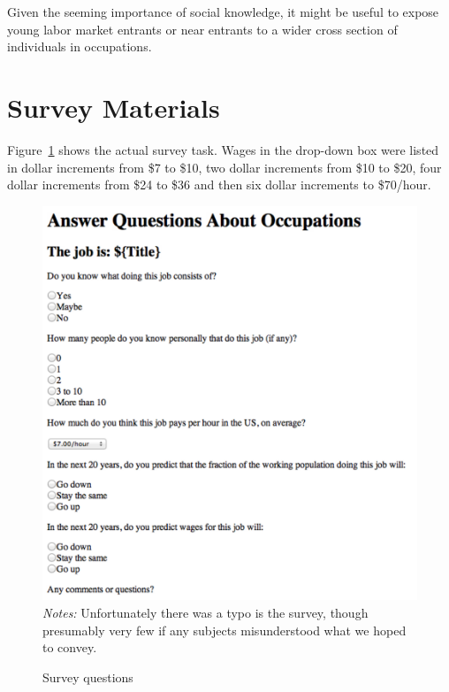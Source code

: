 \documentclass[11pt]{article}
\begin{document}
Given the seeming importance of social knowledge, it might be useful to expose young labor market entrants or near entrants to a wider cross section of individuals in occupations.
 




\newpage 

\appendix 

\section{Survey Materials} \label{sec:survey}  
Figure~\ref{fig:survey} shows the actual survey task.  
Wages in the drop-down box were listed in dollar increments from \$7 to \$10, two dollar increments from \$10 to \$20, four dollar increments from \$24 to \$36 and then six dollar increments to \$70/hour.  

\begin{figure}
\centering
\caption{Survey questions \label{fig:survey}}
\begin{minipage}{0.75 \linewidth}
\includegraphics[width = \linewidth]{./images/survey.png}
\emph{Notes:} Unfortunately there was a typo is the survey, though presumably very few if any subjects misunderstood what we hoped to convey. 
\end{minipage}  
\end{figure} 
\end{document}
